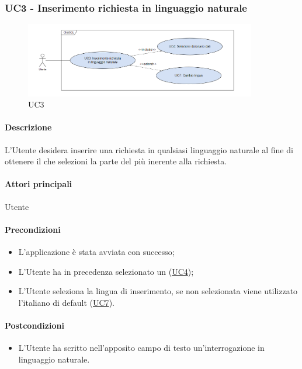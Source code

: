 \subsubsection{UC3 - Inserimento richiesta in linguaggio naturale}\label{UC3}

\begin{figure}[H]
  \centering
  \includegraphics[width=0.90\textwidth]{assets/uc3.png}
  \caption{UC3}
\end{figure}

\paragraph*{Descrizione}
L’Utente desidera inserire una richiesta in qualsiasi linguaggio naturale al fine di ottenere il  che selezioni la parte del  più inerente alla richiesta. 

\paragraph*{Attori principali}
Utente

\paragraph*{Precondizioni}
\begin{itemize}
  \item L'applicazione è stata avviata con successo;
  \item L’Utente ha in precedenza selezionato un  (\hyperref[UC4]{UC4}); 
  \item L'Utente seleziona la lingua di inserimento, se non selezionata viene utilizzato l'italiano di default (\hyperref[UC7]{UC7}).
\end{itemize}

\paragraph*{Postcondizioni}
\begin{itemize}
  \item L’Utente ha scritto nell’apposito campo di testo un'interrogazione in linguaggio naturale.
\end{itemize}

